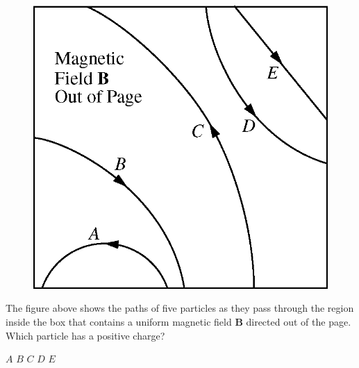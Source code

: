 \begin{figure}[H]
    \center
    \includegraphics[scale=0.25]{images/img-013-024.png}
\end{figure}

\begin{questions}\setcounter{question}{33}\question
The figure above shows the paths of five particles as they pass through the region inside the box that contains a uniform magnetic field $\mathbf{B}$ directed out of the page. Which particle has a positive charge?

\begin{oneparchoices}
\choice $A$
\choice $B$
\choice $C$
\choice $D$
\choice $E$
\end{oneparchoices}\end{questions}

